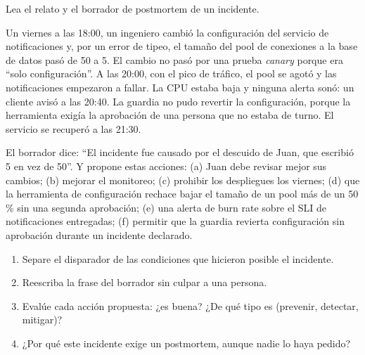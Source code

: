 \documentclass[variant=guia,cover=institutional,mode=screen]{ua-engineering-v6-article}
\begin{document}
\begin{uaexercise}
Lea el relato y el borrador de postmortem de un incidente.

Un viernes a las 18:00, un ingeniero cambió la configuración del servicio de notificaciones y, por un error de tipeo, el tamaño del pool de conexiones a la base de datos pasó de 50 a 5. El cambio no pasó por una prueba \emph{canary} porque era ``solo configuración''. A las 20:00, con el pico de tráfico, el pool se agotó y las notificaciones empezaron a fallar. La CPU estaba baja y ninguna alerta sonó: un cliente avisó a las 20:40. La guardia no pudo revertir la configuración, porque la herramienta exigía la aprobación de una persona que no estaba de turno. El servicio se recuperó a las 21:30.

El borrador dice: ``El incidente fue causado por el descuido de Juan, que escribió 5 en vez de 50''. Y propone estas acciones: (a) Juan debe revisar mejor sus cambios; (b) mejorar el monitoreo; (c) prohibir los despliegues los viernes; (d) que la herramienta de configuración rechace bajar el tamaño de un pool más de un 50\,\% sin una segunda aprobación; (e) una alerta de burn rate sobre el SLI de notificaciones entregadas; (f) permitir que la guardia revierta configuración sin aprobación durante un incidente declarado.
\begin{enumerate}
\item Separe el disparador de las condiciones que hicieron posible el incidente.
\item Reescriba la frase del borrador sin culpar a una persona.
\item Evalúe cada acción propuesta: ¿es buena? ¿De qué tipo es (prevenir, detectar, mitigar)?
\item ¿Por qué este incidente exige un postmortem, aunque nadie lo haya pedido?
\end{enumerate}
\end{uaexercise}
\end{document}
